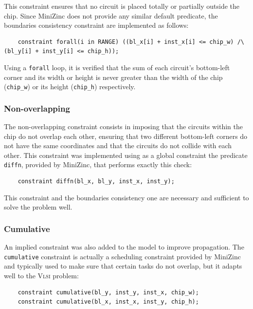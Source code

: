 \documentclass[a4paper, 12pt]{article}
\begin{document}
This constraint ensures that no circuit is placed totally or partially outside the chip. Since MiniZinc does not provide any similar default predicate, the boundaries consistency constraint are implemented as follows:
\begin{verbatim}
    constraint forall(i in RANGE) ((bl_x[i] + inst_x[i] <= chip_w) /\ (bl_y[i] + inst_y[i] <= chip_h));
\end{verbatim}

Using a \verb|forall| loop, it is verified that the sum of each circuit's bottom-left corner and its width or height is never greater than the width of the chip (\verb|chip_w|) or its height (\verb|chip_h|) respectively.


\subsubsection{Non-overlapping}

The non-overlapping constraint consists in imposing that the circuits within the chip do not overlap each other, ensuring that two different bottom-left corners do not have the same coordinates and that the circuits do not collide with each other. This constraint was implemented using as a global constraint the predicate \verb|diffn|, provided by MiniZinc, that performs exactly this check:
\begin{verbatim}
    constraint diffn(bl_x, bl_y, inst_x, inst_y);
\end{verbatim}

This constraint and the boundaries consistency one are necessary and sufficient to solve the problem well.


\subsubsection{Cumulative}

An implied constraint was also added to the model to improve propagation. The \verb|cumulative| constraint is actually a scheduling constraint provided by MiniZinc and typically used to make sure that certain tasks do not overlap, but it adapts well to the \textsc{Vlsi} problem:
\begin{verbatim}
    constraint cumulative(bl_y, inst_y, inst_x, chip_w);
    constraint cumulative(bl_x, inst_x, inst_y, chip_h);
\end{verbatim}
\end{document}
